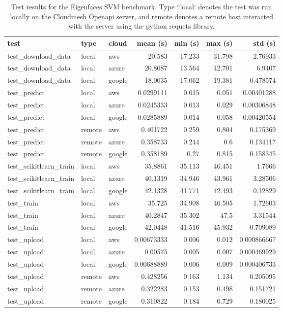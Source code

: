\begin{table}[htb]
  
\caption{Test results for the Eigenfaces SVM benchmark. Type
``local: denotes the test was run locally on the Cloudmesh Openapi
server, and remote denotes a remote host interacted with the server
using the python requets library.}
\label{tab:2}


\begin{tabular}[]{@{}lllrrrr@{}}
\toprule
test & type & cloud & mean (s) & min (s) & max (s) & std
(s)\tabularnewline
\midrule
test\_download\_data & local & aws & 20.583 & 17.233 & 31.798 &
2.76933\tabularnewline
test\_download\_data & local & azure & 20.8087 & 13.564 & 42.701 &
6.9407\tabularnewline
test\_download\_data & local & google & 18.0035 & 17.062 & 19.381 &
0.478574\tabularnewline
test\_predict & local & aws & 0.0299111 & 0.015 & 0.051 &
0.00401288\tabularnewline
test\_predict & local & azure & 0.0245333 & 0.013 & 0.029 &
0.00306848\tabularnewline
test\_predict & local & google & 0.0285889 & 0.014 & 0.058 &
0.00420554\tabularnewline
test\_predict & remote & aws & 0.401722 & 0.259 & 0.804 &
0.175369\tabularnewline
test\_predict & remote & azure & 0.358733 & 0.244 & 0.6 &
0.134117\tabularnewline
test\_predict & remote & google & 0.358189 & 0.27 & 0.815 &
0.158345\tabularnewline
test\_scikitlearn\_train & local & aws & 35.8861 & 35.113 & 46.451 &
1.7666\tabularnewline
test\_scikitlearn\_train & local & azure & 40.1319 & 34.946 & 43.961 &
3.28506\tabularnewline
test\_scikitlearn\_train & local & google & 42.1328 & 41.771 & 42.493 &
0.12829\tabularnewline
test\_train & local & aws & 35.725 & 34.908 & 46.505 &
1.72603\tabularnewline
test\_train & local & azure & 40.2847 & 35.302 & 47.5 &
3.31544\tabularnewline
test\_train & local & google & 42.0448 & 41.516 & 45.932 &
0.709089\tabularnewline
test\_upload & local & aws & 0.00673333 & 0.006 & 0.012 &
0.000866667\tabularnewline
test\_upload & local & azure & 0.00575 & 0.005 & 0.007 &
0.000469929\tabularnewline
test\_upload & local & google & 0.00688889 & 0.006 & 0.009 &
0.000406733\tabularnewline
test\_upload & remote & aws & 0.428256 & 0.163 & 1.134 &
0.205095\tabularnewline
test\_upload & remote & azure & 0.322283 & 0.153 & 0.498 &
0.151721\tabularnewline
test\_upload & remote & google & 0.310822 & 0.184 & 0.729 &
0.180025\tabularnewline
\bottomrule
\end{tabular}
\end{table}

